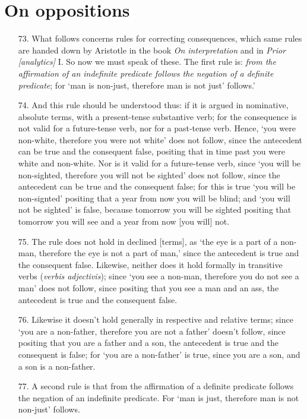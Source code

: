 \documentclass[]{article}
\begin{document}
\section{On oppositions}
\begin{itemize}
\item[73.] What follows concerns rules for correcting consequences, which same rules are handed down by Aristotle in the book \textit{On interpretation} and in \textit{Prior [analytics]} I. So now we must speak of these. The first rule is: \textit{from the affirmation of an indefinite predicate follows the negation of a definite predicate}; for `man is non-just, therefore man is not just' follows.'
\item[74.] And this rule should be understood thus: if it is argued in nominative, absolute terms, with a present-tense substantive verb; for the consequence is not valid for a future-tense verb, nor for a past-tense verb. Hence, `you were non-white, therefore you were not white' does not follow, since the antecedent can be true and the consequent false, positing that in time past you were white and non-white. Nor is it valid for a future-tense verb, since `you will be non-sighted, therefore you will not be sighted' does not follow, since the antecedent can be true and the consequent false; for this is true `you will be non-signted' positing that a year from now you will be blind; and `you will not be sighted' is false, because tomorrow you will be sighted positing that tomorrow you will see and a year from now [you will] not.
\item[75.] The rule does not hold in declined [terms], as `the eye is a part of a non-man, therefore the eye is not a part of man,' since the antecedent is true and the consequent false. Likewise, neither does it hold formally in transitive verbs (\textit{verbis adjectivis}); since `you see a non-man, therefore you do not see a man' does not follow, since positing that you see a man and an ass, the antecedent is true and the consequent false.
\item[76.] Likewise it doesn't hold generally in respective and relative terms; since `you are a non-father, therefore you are not a father' doesn't follow, since positing that you are a father and a son, the antecedent is true and the consequent is false; for `you are a non-father' is true, since you are a son, and a son is a non-father.
\item[77.] A second rule is that from the affirmation of a definite predicate follows the negation of an indefinite predicate. For `man is just, therefore man is not non-just' follows.

\end{itemize}
\end{document}
